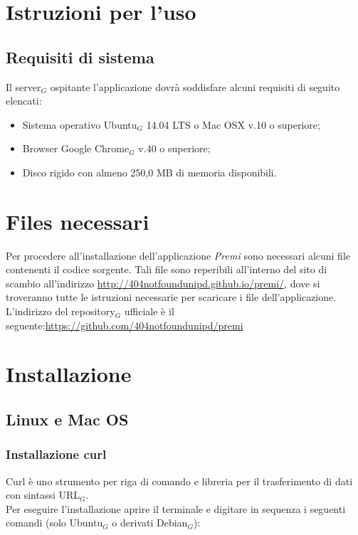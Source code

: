 \section{Istruzioni per l'uso}
\subsection{Requisiti di sistema}
Il server$_G$ ospitante l'applicazione dovrà soddisfare alcuni requisiti di seguito elencati:
\begin{itemize}
\item Sistema operativo Ubuntu$_G$ 14.04 LTS o Mac OSX v.10 o superiore;
\item Browser Google Chrome$_G$ v.40 o superiore;
\item Disco rigido con almeno 250,0 MB di memoria disponibili.
\end{itemize}

\section{Files necessari}
Per procedere all'installazione dell'applicazione \emph{Premi} sono necessari alcuni file contenenti il codice sorgente.
Tali file sono reperibili all'interno del sito di scambio all'indirizzo \href{http://404notfoundunipd.github.io/premi/}{http://404notfoundunipd.github.io/premi/}, dove si troveranno tutte le istruzioni necessarie per scaricare i file dell'applicazione.\\
L'indirizzo del repository$_G$ ufficiale è il seguente:\href{https://github.com/404notfoundunipd/premi}{https://github.com/404notfoundunipd/premi}

\section{Installazione}
\subsection{Linux e Mac OS}

\subsubsection{Installazione curl}
Curl è uno strumento per riga di comando e libreria per il trasferimento di dati con sintassi URL$_G$. \\

\noindent Per eseguire l'installazione aprire il terminale e digitare in sequenza i seguenti comandi (solo Ubuntu$_G$ o derivati Debian$_G$):

